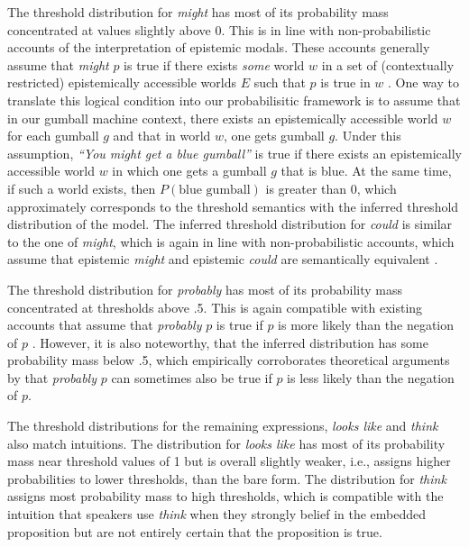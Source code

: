 \documentclass[lucida,biblatex]{sp} %
\begin{document}
The threshold distribution for \textit{might} has most of its probability mass concentrated at values slightly above 0. This 
is in line with non-probabilistic accounts of the interpretation of epistemic modals. These accounts generally assume that \textit{might} $p$ is true 
if there exists \textit{some} world $w$ in a set of (contextually restricted) epistemically accessible worlds $E$ such that $p$ is true in $w$ 
\citep[e.g.,][]{Kratzer1991,Swanson2008,Hacquard2012}. One way to translate this logical condition into our probabilisitic framework is to assume that 
in our gumball machine context, there exists an epistemically accessible world $w$ for each gumball $g$ and that in world $w$, one gets gumball $g$. 
Under this assumption, \textit{``You might get a blue gumball''} is true if there exists an epistemically accessible world $w$  in which one gets a
gumball $g$ that is blue. At the same time, if such a world exists, then $P(\mbox{blue gumball})$ is greater than 0, which approximately corresponds
to the threshold semantics with the inferred threshold distribution of the model. The inferred threshold distribution for \textit{could} is similar to the one of \textit{might}, 
which is again in line with non-probabilistic accounts, which assume that epistemic \textit{might} and epistemic \textit{could} are semantically equivalent \citep{Kratzer1991,Hacquard2012}.

The threshold distribution for \textit{probably} has most of its probability mass concentrated at thresholds above .5. This is again compatible with existing accounts that assume 
that \textit{probably} $p$ is true if $p$ is more likely than the negation of $p$ \citep[e.g.,][]{Kratzer1991}. However, it is also noteworthy, that the inferred
distribution has some probability mass below .5, which empirically corroborates theoretical arguments by \citet{Yalcin2010} that \textit{probably} $p$ can
sometimes also be true if $p$ is less likely than the negation of $p$.

The threshold distributions for the remaining expressions, \textit{looks like} and \textit{think} also match intuitions. The distribution for 
\textit{looks like} has most of its probability mass near threshold values of 1 but is overall slightly weaker, i.e., assigns higher probabilities to lower thresholds,
than the bare form. The distribution for \textit{think} assigns most probability mass to high thresholds, which is compatible with the intuition
that speakers use \textit{think} when they strongly belief in the embedded proposition but are not entirely certain that the proposition is true.
 
\end{document}
